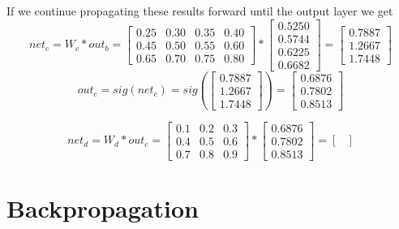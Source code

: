 \documentclass[11pt, halfparskip]{article}
\begin{document}
        \newpage
        If we continue propagating these results forward until the output layer we get
        \[
        	net_c = W_c * out_b = 
        	\begin{bmatrix}
        		0.25 & 0.30 & 0.35 & 0.40\\
            	0.45 & 0.50 & 0.55 & 0.60\\
            	0.65 & 0.70 & 0.75 & 0.80
        	\end{bmatrix}
        	*
        	\begin{bmatrix}
        		0.5250\\
        		0.5744\\
        		0.6225\\
        		0.6682
        	\end{bmatrix}
        	=
        	\begin{bmatrix}
        		0.7887\\
        		1.2667\\
        		1.7448
        	\end{bmatrix}
        \]
        \[
        	out_c = sig(net_c) = sig(
        	   \begin{bmatrix}
        	   	0.7887\\
        		1.2667\\
        		1.7448
        	   \end{bmatrix}
        	) = 
        	\begin{bmatrix}
        		0.6876\\
        		0.7802\\
        		0.8513
        	\end{bmatrix}
        \]
        
        \[
        	net_d = W_d * out_c = 
        	\begin{bmatrix}
        		0.1 & 0.2 & 0.3\\
            	0.4 & 0.5 & 0.6\\
            	0.7 & 0.8 & 0.9
        	\end{bmatrix}
        	*
        	\begin{bmatrix}
        		0.6876\\
        		0.7802\\
        		0.8513
        	\end{bmatrix}
        	        =
        	\begin{bmatrix}
        		
        	\end{bmatrix}
        \]


        
     \section{Backpropagation}
     \label{sec:backpropagation}
\end{document}
